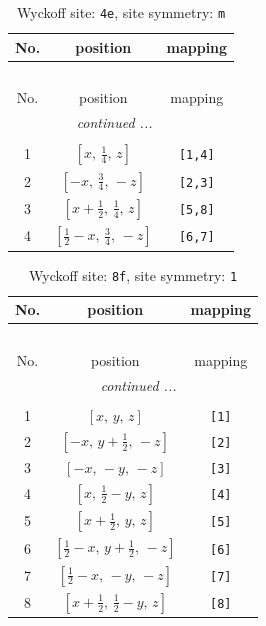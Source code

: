 \documentclass[fleqn,8pt]{jsarticle}
\begin{document}
\renewcommand{\arraystretch}{1.2}
\begin{longtable}{ccc}
\caption{Wyckoff site: {\tt 4e}, site symmetry: {\tt m}}
 \\
 \hline \hline
No. & position & mapping \\ \hline \endfirsthead

\multicolumn{2}{l}{\tablename\ \thetable{}} \\
 \hline \hline
No. & position & mapping \\ \hline \endhead

 \hline \hline
\multicolumn{2}{r}{\footnotesize\it continued ...} \\ \endfoot

 \hline \hline
\multicolumn{2}{r}{} \\ \endlastfoot

1 & $\left[ x,\, \frac{1}{4},\, z \right]$ & {\tt [1,4]} \\ \hline
2 & $\left[ - x,\, \frac{3}{4},\, - z \right]$ & {\tt [2,3]} \\ \hline
3 & $\left[ x + \frac{1}{2},\, \frac{1}{4},\, z \right]$ & {\tt [5,8]} \\ \hline
4 & $\left[ \frac{1}{2} - x,\, \frac{3}{4},\, - z \right]$ & {\tt [6,7]} \\
\end{longtable}
\renewcommand{\arraystretch}{1.2}
\begin{longtable}{ccc}
\caption{Wyckoff site: {\tt 8f}, site symmetry: {\tt 1}}
 \\
 \hline \hline
No. & position & mapping \\ \hline \endfirsthead

\multicolumn{2}{l}{\tablename\ \thetable{}} \\
 \hline \hline
No. & position & mapping \\ \hline \endhead

 \hline \hline
\multicolumn{2}{r}{\footnotesize\it continued ...} \\ \endfoot

 \hline \hline
\multicolumn{2}{r}{} \\ \endlastfoot

1 & $\left[ x,\, y,\, z \right]$ & {\tt [1]} \\ \hline
2 & $\left[ - x,\, y + \frac{1}{2},\, - z \right]$ & {\tt [2]} \\ \hline
3 & $\left[ - x,\, - y,\, - z \right]$ & {\tt [3]} \\ \hline
4 & $\left[ x,\, \frac{1}{2} - y,\, z \right]$ & {\tt [4]} \\ \hline
5 & $\left[ x + \frac{1}{2},\, y,\, z \right]$ & {\tt [5]} \\ \hline
6 & $\left[ \frac{1}{2} - x,\, y + \frac{1}{2},\, - z \right]$ & {\tt [6]} \\ \hline
7 & $\left[ \frac{1}{2} - x,\, - y,\, - z \right]$ & {\tt [7]} \\ \hline
8 & $\left[ x + \frac{1}{2},\, \frac{1}{2} - y,\, z \right]$ & {\tt [8]} \\
\end{longtable}
\end{document}
